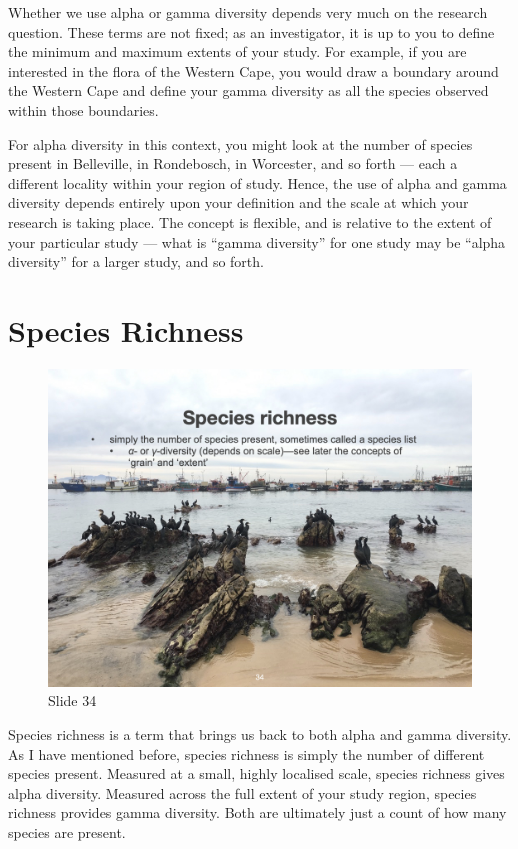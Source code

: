 \documentclass[
  10pt,
]{book}
\begin{document}
Whether we use alpha or gamma diversity depends very much on the
research question. These terms are not fixed; as an investigator, it is
up to you to define the minimum and maximum extents of your study. For
example, if you are interested in the flora of the Western Cape, you
would draw a boundary around the Western Cape and define your gamma
diversity as all the species observed within those boundaries.

For alpha diversity in this context, you might look at the number of
species present in Belleville, in Rondebosch, in Worcester, and so forth
--- each a different locality within your region of study. Hence, the
use of alpha and gamma diversity depends entirely upon your definition
and the scale at which your research is taking place. The concept is
flexible, and is relative to the extent of your particular study ---
what is ``gamma diversity'' for one study may be ``alpha diversity'' for
a larger study, and so forth.

\section{Species Richness}\label{species-richness}

\begin{figure}[ht]
\centering
\includegraphics[width=0.8\linewidth]{../images/BDC334/BDC334-034.jpeg}
\caption*{Slide 34}
\end{figure}

Species richness is a term that brings us back to both alpha and gamma
diversity. As I have mentioned before, species richness is simply the
number of different species present. Measured at a small, highly
localised scale, species richness gives alpha diversity. Measured across
the full extent of your study region, species richness provides gamma
diversity. Both are ultimately just a count of how many species are
present.
\end{document}
